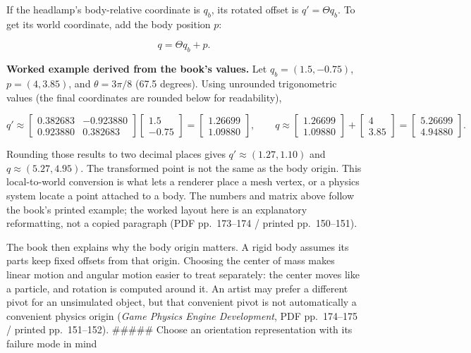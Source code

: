 If the headlamp's body-relative coordinate is \(q_b\), its rotated offset is \(q' = \Theta q_b\). To get its world coordinate, add the body position \(p\):

\[
q = \Theta q_b + p.
\]

\textbf{Worked example derived from the book's values.} Let \(q_b = (1.5,-0.75)\), \(p=(4,3.85)\), and \(\theta=3\pi/8\) (67.5 degrees). Using unrounded trigonometric values (the final coordinates are rounded below for readability),

\[
q' \approx \begin{bmatrix}0.382683&-0.923880\\0.923880&0.382683\end{bmatrix}
\begin{bmatrix}1.5\\-0.75\end{bmatrix}
= \begin{bmatrix}1.26699\\1.09880\end{bmatrix},
\qquad
q \approx \begin{bmatrix}1.26699\\1.09880\end{bmatrix}
+ \begin{bmatrix}4\\3.85\end{bmatrix}
= \begin{bmatrix}5.26699\\4.94880\end{bmatrix}.
\]

Rounding those results to two decimal places gives \(q'\approx(1.27,1.10)\) and \(q\approx(5.27,4.95)\). The transformed point is not the same as the body origin. This local-to-world conversion is what lets a renderer place a mesh vertex, or a physics system locate a point attached to a body. The numbers and matrix above follow the book's printed example; the worked layout here is an explanatory reformatting, not a copied paragraph (PDF pp.~173--174 / printed pp.~150--151).

The book then explains why the body origin matters. A rigid body assumes its parts keep fixed offsets from that origin. Choosing the center of mass makes linear motion and angular motion easier to treat separately: the center moves like a particle, and rotation is computed around it. An artist may prefer a different pivot for an unsimulated object, but that convenient pivot is not automatically a convenient physics origin (\emph{Game Physics Engine Development}, PDF pp.~174--175 / printed pp.~151--152). \#\#\#\#\# Choose an orientation representation with its failure mode in mind

